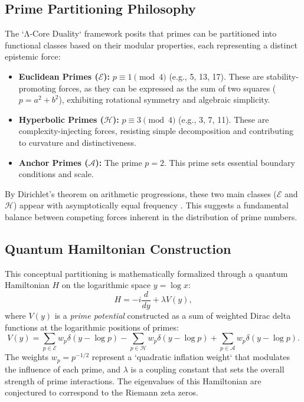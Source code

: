 \documentclass[12pt]{article}
\begin{document}
\subsection{Prime Partitioning Philosophy}
The `Λ-Core Duality` framework posits that primes can be partitioned into functional classes based on their modular properties, each representing a distinct epistemic force:
\begin{itemize}
\item \textbf{Euclidean Primes ($\mathcal{E}$):} $p \equiv 1 \pmod{4}$ (e.g., 5, 13, 17). These are stability-promoting forces, as they can be expressed as the sum of two squares ($p = a^2 + b^2$), exhibiting rotational symmetry and algebraic simplicity.
\item \textbf{Hyperbolic Primes ($\mathcal{H}$):} $p \equiv 3 \pmod{4}$ (e.g., 3, 7, 11). These are complexity-injecting forces, resisting simple decomposition and contributing to curvature and distinctiveness.
\item \textbf{Anchor Primes ($\mathcal{A}$):} The prime $p=2$. This prime sets essential boundary conditions and scale.
\end{itemize}
By Dirichlet's theorem on arithmetic progressions, these two main classes ($\mathcal{E}$ and $\mathcal{H}$) appear with asymptotically equal frequency \cite{iwaniec2004}. This suggests a fundamental balance between competing forces inherent in the distribution of prime numbers.

\subsection{Quantum Hamiltonian Construction}
This conceptual partitioning is mathematically formalized through a quantum Hamiltonian $H$ on the logarithmic space $y=\log x$:
\begin{equation}
H = -i\frac{d}{dy} + \lambda V(y),
\end{equation}
where $V(y)$ is a \textit{prime potential} constructed as a sum of weighted Dirac delta functions at the logarithmic positions of primes:
\begin{equation}
V(y) = \sum_{p \in \mathcal{E}} w_p \delta(y - \log p) - \sum_{p \in \mathcal{H}} w_p \delta(y - \log p) + \sum_{p \in \mathcal{A}} w_p \delta(y - \log p).
\end{equation}
The weights $w_p = p^{-1/2}$ represent a `quadratic inflation weight` that modulates the influence of each prime, and $\lambda$ is a coupling constant that sets the overall strength of prime interactions. The eigenvalues of this Hamiltonian are conjectured to correspond to the Riemann zeta zeros.
\end{document}
